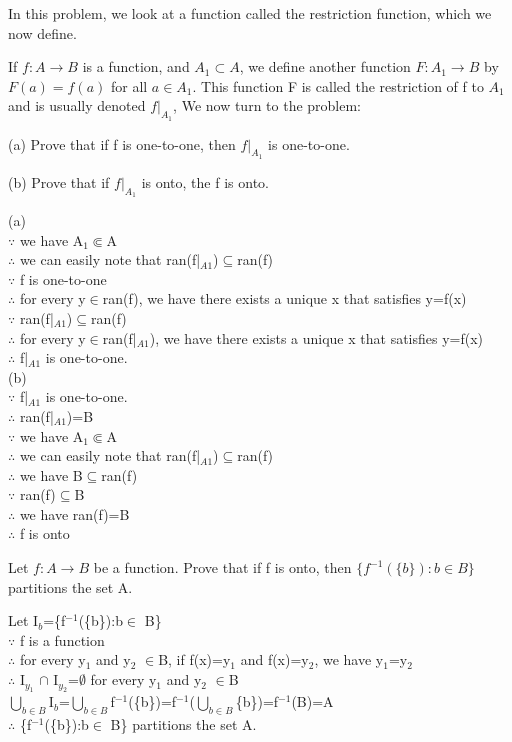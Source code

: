 \documentclass[11pt, a4paper, UTF8]{ctexart}
\begin{document}
\begin{problem}[UD:15.20]
In this problem, we look at a function called the restriction function, which we now define.

If \(f:A \rightarrow B\) is a function, and \(A_{1} \subset A\), we define another function \(F:A_{1} \rightarrow B\) by \(F(a) = f(a)\) for all \(a \in A_{1}\). This function F is called the restriction of f to \(A_{1}\) and is usually denoted \(f|_{A_{1}}\), We now turn to the problem:

(a) Prove that if f is one-to-one, then \(f|_{A_{1}}\) is one-to-one.

(b) Prove that if \(f|_{A_{1}}\) is onto, the f is onto.
\end{problem}
\begin{solution}
(a)\\
$\because$ we have A$_1$$\Subset$A\\
$\therefore$ we can easily note that ran(f|$_{A1}$)$\subseteq$ran(f)\\
$\because$ f is one-to-one\\
$\therefore$ for every y$\in$ran(f), we have there exists a unique x that satisfies y=f(x)\\
$\because$ ran(f|$_{A1}$)$\subseteq$ran(f)\\
$\therefore$ for every y$\in$ran(f|$_{A1}$), we have there exists a unique x that satisfies y=f(x)\\
$\therefore$ f|$_{A1}$ is one-to-one.\\
(b)\\
$\because$ f|$_{A1}$ is one-to-one.\\
$\therefore$ ran(f|$_{A1}$)=B\\
$\because$ we have A$_1$$\Subset$A\\
$\therefore$ we can easily note that ran(f|$_{A1}$)$\subseteq$ran(f)\\
$\therefore$ we have B$\subseteq$ran(f)\\
$\because$ ran(f)$\subseteq$B\\
$\therefore$ we have ran(f)=B\\
$\therefore$ f is onto
\end{solution}

\begin{problem}[UD:16.19]
Let \(f:A \rightarrow B\) be a function. Prove that if f is onto, then \(\{f^{-1}(\{b\}): b \in B\}\) partitions the set A.
\end{problem}
\begin{solution}
Let I$_b$=\{f$^{-1}$(\{b\}):b$\in$ B\}\\
$\because$ f is a function\\
$\therefore$ for every y$_1$ and y$_2$ $\in$B, if f(x)=y$_1$ and f(x)=y$_2$, we have y$_1$=y$_2$\\
$\therefore$ I$_{y_1}$ $\cap$ I$_{y_2}$=$\emptyset$ for every y$_1$ and y$_2$ $\in$B\\
$\bigcup _{b\in B}$I$_b$=$\bigcup_{b\in B}$f$^{-1}$(\{b\})=f$^{-1}$($\bigcup _{b\in B}$\{b\})=f$^{-1}$(B)=A\\
$\therefore$ \{f$^{-1}$(\{b\}):b$\in$ B\} partitions the set A.\\
\end{solution}
\end{document}
